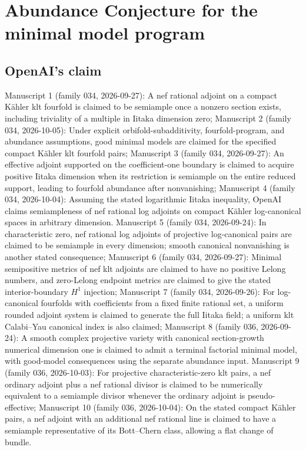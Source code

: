\documentclass[11pt]{article}
\begin{document}
\section*{Abundance Conjecture for the minimal model program}

\subsection{OpenAI's claim}
Manuscript 1 (family 034, 2026-09-27): A nef rational adjoint on a compact Kähler klt fourfold is claimed to be semiample once a nonzero section exists, including triviality of a multiple in Iitaka dimension zero; Manuscript 2 (family 034, 2026-10-05): Under explicit orbifold-subadditivity, fourfold-program, and abundance assumptions, good minimal models are claimed for the specified compact Kähler klt fourfold pairs; Manuscript 3 (family 034, 2026-09-27): An effective adjoint supported on the coefficient-one boundary is claimed to acquire positive Iitaka dimension when its restriction is semiample on the entire reduced support, leading to fourfold abundance after nonvanishing; Manuscript 4 (family 034, 2026-10-04): Assuming the stated logarithmic Iitaka inequality, OpenAI claims semiampleness of nef rational log adjoints on compact Kähler log-canonical spaces in arbitrary dimension. Manuscript 5 (family 034, 2026-09-24): In characteristic zero, nef rational log adjoints of projective log-canonical pairs are claimed to be semiample in every dimension; smooth canonical nonvanishing is another stated consequence; Manuscript 6 (family 034, 2026-09-27): Minimal semipositive metrics of nef klt adjoints are claimed to have no positive Lelong numbers, and zero-Lelong endpoint metrics are claimed to give the stated interior-boundary $H^1$ injection; Manuscript 7 (family 034, 2026-09-26): For log-canonical fourfolds with coefficients from a fixed finite rational set, a uniform rounded adjoint system is claimed to generate the full Iitaka field; a uniform klt Calabi--Yau canonical index is also claimed; Manuscript 8 (family 036, 2026-09-24): A smooth complex projective variety with canonical section-growth numerical dimension one is claimed to admit a terminal factorial minimal model, with good-model consequences using the separate abundance input. Manuscript 9 (family 036, 2026-10-03): For projective characteristic-zero klt pairs, a nef ordinary adjoint plus a nef rational divisor is claimed to be numerically equivalent to a semiample divisor whenever the ordinary adjoint is pseudo-effective; Manuscript 10 (family 036, 2026-10-04): On the stated compact Kähler pairs, a nef adjoint with an additional nef rational line is claimed to have a semiample representative of its Bott--Chern class, allowing a flat change of bundle.
\end{document}

